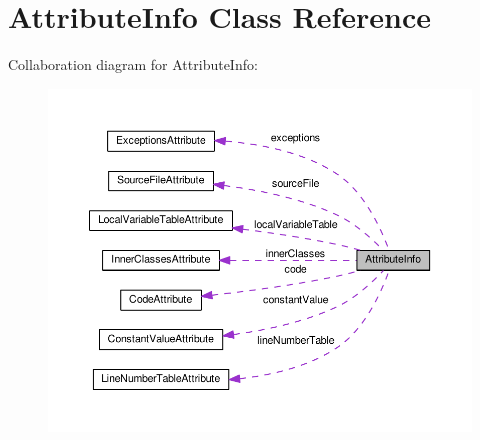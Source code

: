 \hypertarget{classAttributeInfo}{}\section{Attribute\+Info Class Reference}
\label{classAttributeInfo}


Collaboration diagram for Attribute\+Info\+:
\nopagebreak
\begin{figure}[H]
\begin{center}
\leavevmode
\includegraphics[width=350pt]{classAttributeInfo__coll__graph}
\end{center}
\end{figure}
